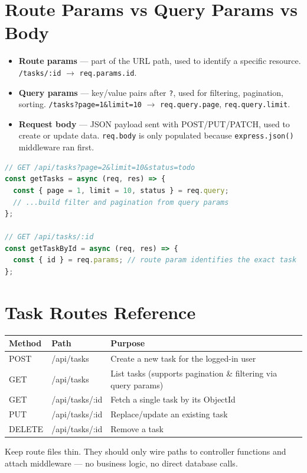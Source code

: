 \section{Route Params vs Query Params vs Body}

\begin{itemize}
  \item \textbf{Route params} --- part of the URL path, used to identify a specific resource. \texttt{/tasks/:id} $\rightarrow$ \texttt{req.params.id}.
  \item \textbf{Query params} --- key/value pairs after \texttt{?}, used for filtering, pagination, sorting. \texttt{/tasks?page=1\&limit=10} $\rightarrow$ \texttt{req.query.page}, \texttt{req.query.limit}.
  \item \textbf{Request body} --- JSON payload sent with POST/PUT/PATCH, used to create or update data. \texttt{req.body} is only populated because \texttt{express.json()} middleware ran first.
\end{itemize}

\begin{lstlisting}[language=JavaScript]
// GET /api/tasks?page=2&limit=10&status=todo
const getTasks = async (req, res) => {
  const { page = 1, limit = 10, status } = req.query;
  // ...build filter and pagination from query params
};

// GET /api/tasks/:id
const getTaskById = async (req, res) => {
  const { id } = req.params; // route param identifies the exact task
};
\end{lstlisting}

\section{Task Routes Reference}

\begin{table}[h]
\centering
\begin{tabularx}{\textwidth}{l l X}
\toprule
\textbf{Method} & \textbf{Path} & \textbf{Purpose} \\
\midrule
POST   & /api/tasks      & Create a new task for the logged-in user \\
GET    & /api/tasks      & List tasks (supports pagination \& filtering via query params) \\
GET    & /api/tasks/:id  & Fetch a single task by its ObjectId \\
PUT    & /api/tasks/:id  & Replace/update an existing task \\
DELETE & /api/tasks/:id  & Remove a task \\
\bottomrule
\end{tabularx}
\end{table}

\begin{tipbox}[TIP]
Keep route files thin. They should only wire paths to controller functions and attach middleware — no business logic, no direct database calls.
\end{tipbox}

